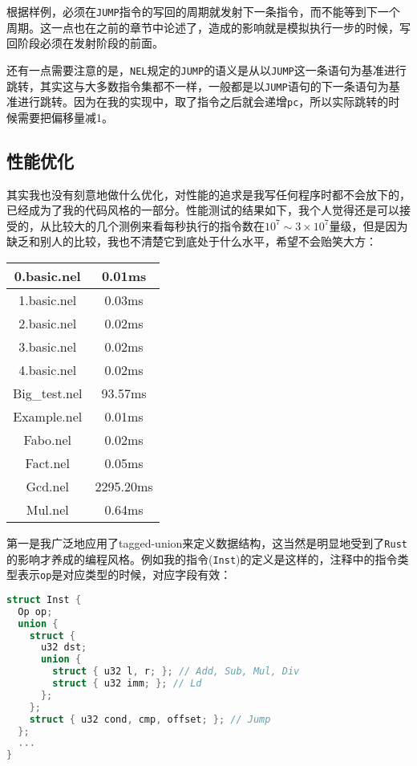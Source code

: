 \documentclass[12pt, UTF8]{article}
\begin{document}
根据样例，必须在\lstinline|JUMP|指令的写回的周期就发射下一条指令，而不能等到下一个周期。这一点也在之前的章节中论述了，造成的影响就是模拟执行一步的时候，写回阶段必须在发射阶段的前面。

还有一点需要注意的是，\lstinline|NEL|规定的\lstinline|JUMP|的语义是从以\lstinline|JUMP|这一条语句为基准进行跳转，其实这与大多数指令集都不一样，一般都是以\lstinline|JUMP|语句的下一条语句为基准进行跳转。因为在我的实现中，取了指令之后就会递增\lstinline|pc|，所以实际跳转的时候需要把偏移量减1。

\subsection{性能优化}

其实我也没有刻意地做什么优化，对性能的追求是我写任何程序时都不会放下的，已经成为了我的代码风格的一部分。性能测试的结果如下，我个人觉得还是可以接受的，从比较大的几个测例来看每秒执行的指令数在$10^7 \sim 3 \times 10^7$量级，但是因为缺乏和别人的比较，我也不清楚它到底处于什么水平，希望不会贻笑大方：

\begin{table}[htbp]
  \centering
  \begin{tabular}{|c|c|}
    \hline
    0.basic.nel   & 0.01ms    \\ \hline
    1.basic.nel   & 0.03ms    \\ \hline
    2.basic.nel   & 0.02ms    \\ \hline
    3.basic.nel   & 0.02ms    \\ \hline
    4.basic.nel   & 0.02ms    \\ \hline
    Big\_test.nel & 93.57ms   \\ \hline
    Example.nel   & 0.01ms    \\ \hline
    Fabo.nel      & 0.02ms    \\ \hline
    Fact.nel      & 0.05ms    \\ \hline
    Gcd.nel       & 2295.20ms \\ \hline
    Mul.nel       & 0.64ms    \\ \hline
  \end{tabular}
\end{table}

第一是我广泛地应用了tagged-union来定义数据结构，这当然是明显地受到了\lstinline|Rust|的影响才养成的编程风格。例如我的指令(\lstinline|Inst|)的定义是这样的，注释中的指令类型表示\lstinline|op|是对应类型的时候，对应字段有效：

\begin{lstlisting}[language = C++]
struct Inst {
  Op op;
  union {
    struct {
      u32 dst;
      union {
        struct { u32 l, r; }; // Add, Sub, Mul, Div
        struct { u32 imm; }; // Ld
      };
    };
    struct { u32 cond, cmp, offset; }; // Jump
  };
  ...
}
\end{lstlisting}
\end{document}
